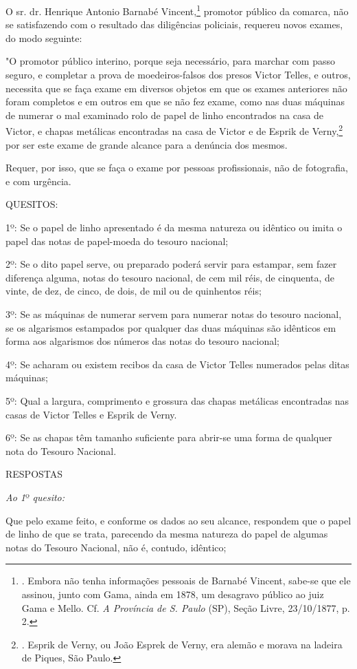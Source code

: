 O sr. dr. Henrique Antonio Barnabé Vincent,\footnote{. Embora não tenha
  informações pessoais de Barnabé Vincent, sabe-se que ele assinou,
  junto com Gama, ainda em 1878, um desagravo público ao juiz Gama e
  Mello. Cf. \emph{A Província de S. Paulo} (SP), Seção Livre,
  23/10/1877, p. 2.} promotor público da comarca, não se satisfazendo
com o resultado das diligências policiais, requereu novos exames, do
modo seguinte:

"O promotor público interino, porque seja necessário, para marchar com
passo seguro, e completar a prova de moedeiros-falsos dos presos Victor
Telles, e outros, necessita que se faça exame em diversos objetos em que
os exames anteriores não foram completos e em outros em que se não fez
exame, como nas duas máquinas de numerar o mal examinado rolo de papel
de linho encontrados na casa de Victor, e chapas metálicas encontradas
na casa de Victor e de Esprik de Verny,\footnote{. Esprik de Verny, ou
  João Esprek de Verny, era alemão e morava na ladeira de Piques, São
  Paulo.} por ser este exame de grande alcance para a denúncia dos
mesmos.

Requer, por isso, que se faça o exame por pessoas profissionais, não de
fotografia, e com urgência.

QUESITOS:

1º: Se o papel de linho apresentado é da mesma natureza ou idêntico ou
imita o papel das notas de papel-moeda do tesouro nacional;

2º: Se o dito papel serve, ou preparado poderá servir para estampar, sem
fazer diferença alguma, notas do tesouro nacional, de cem mil réis, de
cinquenta, de vinte, de dez, de cinco, de dois, de mil ou de quinhentos
réis;

3º: Se as máquinas de numerar servem para numerar notas do tesouro
nacional, se os algarismos estampados por qualquer das duas máquinas são
idênticos em forma aos algarismos dos números das notas do tesouro
nacional;

4º: Se acharam ou existem recibos da casa de Victor Telles numerados
pelas ditas máquinas;

5º: Qual a largura, comprimento e grossura das chapas metálicas
encontradas nas casas de Victor Telles e Esprik de Verny.

6º: Se as chapas têm tamanho suficiente para abrir-se uma forma de
qualquer nota do Tesouro Nacional.

RESPOSTAS

\emph{Ao 1}º \emph{quesito:}

Que pelo exame feito, e conforme os dados ao seu alcance, respondem que
o papel de linho de que se trata, parecendo da mesma natureza do papel
de algumas notas do Tesouro Nacional, não é, contudo, idêntico;

